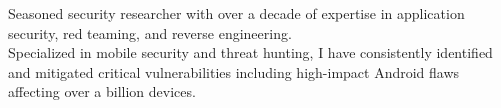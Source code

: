 \documentclass[10pt,a4paper,ragged2e,withhyper]{altacv}
\begin{document}


\makecvheader

\begin{center}
\small
\textcolor{emphasis}{Seasoned security researcher with over a decade of expertise in application security, red teaming, and reverse engineering.\\Specialized in mobile security and threat hunting, I have consistently identified and mitigated critical vulnerabilities including high-impact Android flaws affecting over a billion devices.}
\end{center}

\end{document}
